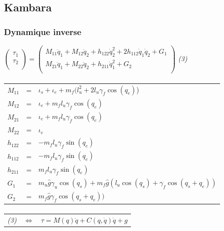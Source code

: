 \documentclass[pdftex,a4paper,11pt]{article}
\begin{document}

\subsection{Kambara}

\subsubsection{Dynamique inverse}
$
\begin{pmatrix}
    \tau_1 \\
    \tau_2 \\
\end{pmatrix}
=
\begin{pmatrix}
    M_{11}\ddot{q}_1 + M_{12}\ddot{q}_2 + h_{122}\dot{q}_2^2 + 2h_{112}\dot{q}_1\dot{q}_2 + G_1 \\
    M_{21}\ddot{q}_1 + M_{22}\ddot{q}_2 + h_{211}\dot{q}_1^2 + G_2 \\
\end{pmatrix}
$
\emph{(3)}

\paragraph{}
\begin{tabular}{lcl}
    $M_{11}$ & = & $\iota_s + \iota_e + m_f(l_u^2 + 2 l_u \gamma_f \cos(q_e)$) \\
    $M_{12}$ & = & $\iota_e + m_f l_u \gamma_f \cos(q_e)$ \\
    $M_{21}$ & = & $\iota_e + m_f l_u \gamma_f \cos(q_e)$ \\
    $M_{22}$ & = & $\iota_e$ \\
    $h_{122}$ & = & $-m_f l_u \gamma_f \sin(q_e)$ \\
    $h_{112}$ & = & $-m_f l_u \gamma_f \sin(q_e)$ \\
    $h_{211}$ & = & $m_f l_u  \gamma_f \sin(q_e)$ \\
    $G_1$ & = & $m_u \hat{g}  \gamma_u \cos(q_s) + m_f \hat{g} (l_u \cos(q_s) + \gamma_f \cos(q_s + q_e))$ \\
    $G_2$ & = & $m_f \hat{g}  \gamma_f \cos(q_s + q_e))$ \\
\end{tabular}

\paragraph{}
\begin{tabular}{lcl}
    \emph{(3)} & $\Leftrightarrow$ & $\tau = M(q)\ddot{q} + C(q, \dot{q}) \dot{q} + g$ \\
\end{tabular}
\end{document}
